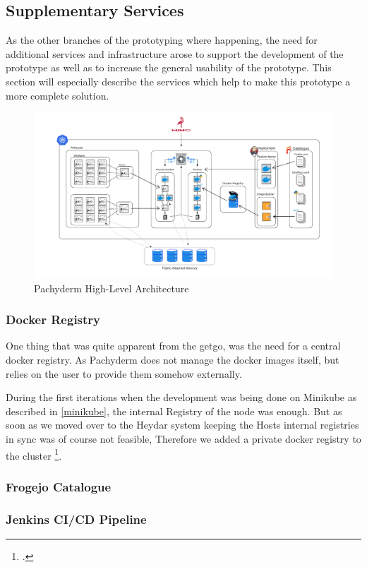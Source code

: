 \subsection{Supplementary Services}

As the other branches of the prototyping where happening, the need for additional services and infrastructure arose to 
support the development of the prototype as well as to increase the general usability of the prototype. 
This section will especially describe the services which help to make this prototype a more complete solution.


\begin{figure}[htb]
    \centering
    \includegraphics[width=17cm]{graphics/pachykouda_complete.png}
    \caption[Pachyderm High-Level Architecture]{Pachyderm High-Level Architecture}
    \label{abb:pachyderm_complete}
\end{figure}

\subsubsection{Docker Registry}

One thing that was quite apparent from the getgo, was the need for a central docker registry.
As Pachyderm does not manage the docker images itself, but relies on the user to provide them somehow externally.

During the first iterations when the development was being done on Minikube as described in \ref{minikube}, the internal Registry 
of the node was enough.
But as soon as we moved over to the Heydar system keeping the Hosts internal registries in sync was of course not feasible,
Therefore we added a private docker registry to the cluster \footcite{kumarHowSetupPrivate2020}.

\subsubsection{Frogejo Catalogue}
\subsubsection{Jenkins CI/CD Pipeline}
